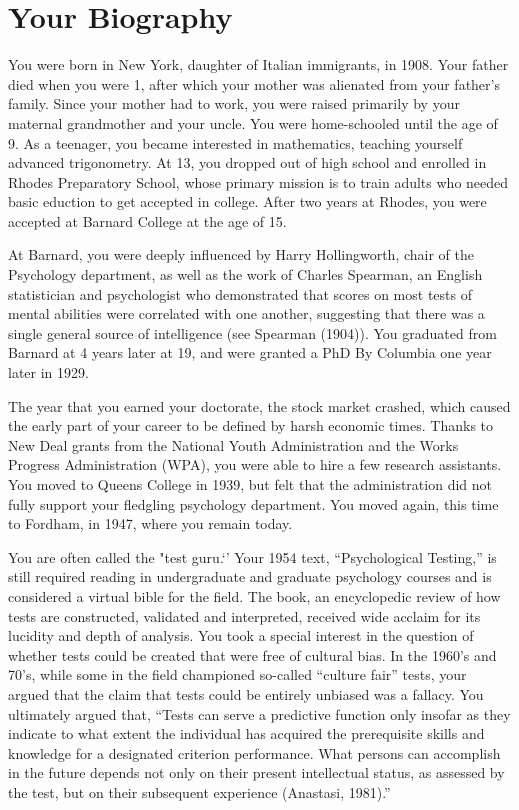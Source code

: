 \section{Your Biography}
\label{yourbiography}

You were born in New York, daughter of Italian immigrants, in 1908. Your father died when you were 1, after which your mother was alienated from your father's family. Since your mother had to work, you were raised primarily by your maternal grandmother and your uncle. You were home-schooled until the age of 9. As a teenager, you became interested in mathematics, teaching yourself advanced trigonometry. At 13, you dropped out of high school and enrolled in Rhodes Preparatory School, whose primary mission is to train adults who needed basic eduction to get accepted in college. After two years at Rhodes, you were accepted at Barnard College at the age of 15.

At Barnard, you were deeply influenced by Harry Hollingworth, chair of the Psychology department, as well as the work of Charles Spearman, an English statistician and psychologist who demonstrated that scores on most tests of mental abilities were correlated with one another, suggesting that there was a single general source of intelligence (see Spearman (1904)). You graduated from Barnard at 4 years later at 19, and were granted a PhD By Columbia one year later in 1929.

The year that you earned your doctorate, the stock market crashed, which caused the early part of your career to be defined by harsh economic times. Thanks to New Deal grants from the National Youth Administration and the Works Progress Administration (WPA), you were able to hire a few research assistants. You moved to Queens College in 1939, but felt that the administration did not fully support your fledgling psychology department. You moved again, this time to Fordham, in 1947, where you remain today.

You are often called the "test guru.`' Your 1954 text, ``Psychological Testing,'' is still required reading in undergraduate and graduate psychology courses and is considered a virtual bible for the field. The book, an encyclopedic review of how tests are constructed, validated and interpreted, received wide acclaim for its lucidity and depth of analysis. You took a special interest in the question of whether tests could be created that were free of cultural bias. In the 1960's and 70's, while some in the field championed so-called ``culture fair'' tests, your argued that the claim that tests could be entirely unbiased was a fallacy. You ultimately argued that, ``Tests can serve a predictive function only insofar as they indicate to what extent the individual has acquired the prerequisite skills and knowledge for a designated criterion performance. What persons can accomplish in the future depends not only on their present intellectual status, as assessed by the test, but on their subsequent experience (Anastasi, 1981).''

